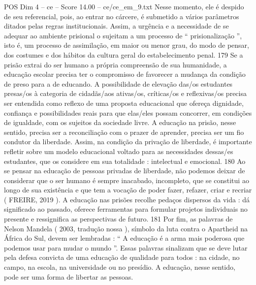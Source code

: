 \begin{textsample}{POS Dim 4 – ce – Score 14.00 – ce/ce\_em\_9.txt}
Nesse momento, ele é despido de seu referencial, pois, ao entrar no cárcere, é submetido a vários parâmetros ditados pelas regras institucionais.
Assim, a urgência e a necessidade de se adequar ao ambiente prisional o sujeitam a um processo de “ prisionalização ”, isto é, um processo de assimilação, em maior ou menor grau, do modo de pensar, dos costumes e dos hábitos da cultura geral do estabelecimento penal. 179 Se a prisão extrai do ser humano a própria compreensão de sua humanidade, a educação escolar precisa ter o compromisso de favorecer a mudança da condição de preso para a de educando.
A possibilidade de elevação das/os estudantes presas/os à categoria de cidadãs/aos ativas/os, críticas/os e reflexivas/os precisa ser entendida como reflexo de uma proposta educacional que ofereça dignidade, confiança e possibilidades reais para que elas/eles possam concorrer, em condições de igualdade, com os sujeitos da sociedade livre.
A educação na prisão, nesse sentido, precisa ser a reconciliação com o prazer de aprender, precisa ser um fio condutor da liberdade.
Assim, na condição da privação de liberdade, é importante refletir sobre um modelo educacional voltado para as necessidades dessas/es estudantes, que os considere em sua totalidade : intelectual e emocional. 180 Ao se pensar na educação de pessoas privadas de liberdade, não podemos deixar de considerar que o ser humano é sempre inacabado, incompleto, que se constitui ao longo de sua existência e que tem a vocação de poder fazer, refazer, criar e recriar ( FREIRE, 2019 ).
A educação nas prisões recolhe pedaços dispersos da vida : dá significado ao passado, oferece ferramentas para formular projetos individuais no presente e ressignifica as perspectivas de futuro. 181 Por fim, as palavras de Nelson Mandela ( 2003, tradução nossa ), símbolo da luta contra o Apartheid na África do Sul, devem ser lembradas : “ A educação é a arma mais poderosa que podemos usar para mudar o mundo ”.
Essas palavras sinalizam que se deve lutar pela defesa convicta de uma educação de qualidade para todos : na cidade, no campo, na escola, na universidade ou no presídio.
A educação, nesse sentido, pode ser uma forma de libertar as pessoas.

\end{textsample}
